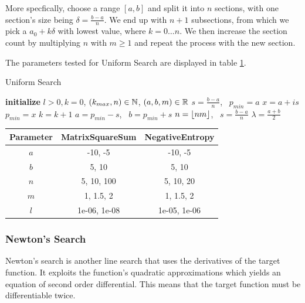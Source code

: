 \documentclass[a4paper,english,titlepage,12pt]{article}
\newcommand{\floor}[1]{\ensuremath\lfloor#1\rfloor}
\newcommand{\R}{\ensuremath\mathbb{R}}
\newcommand{\N}{\ensuremath\mathbb{N}}
\begin{document}
More specfically, choose a range $[a, b]$ and split it into $n$ sections, with one section's size being $\delta = \frac{b - a}{n}$. We end up with $n + 1$ subsections, from which we pick a $a_0 + k \delta$ with lowest value, where $k = 0 \dots n$. We then increase the section count by multiplying $n$ with $m \geq 1$ and repeat the process with the new section. \cite{course_material_nonlinear_optimisation}

The parameters tested for Uniform Search are displayed in table \ref{tab:params_UniformSearch}.


\begin{algorithm}[H]
\caption{Uniform Search}
\label{alg_uniform}
\begin{algorithmic}[1]
\STATE \textbf{initialize} $l > 0, k = 0$, $(k_{max}, n) \in \N$, $(a, b, m) \in \R$
\STATE $s = \frac{b - a}{n}$, \ $p_{min} = a$
        \STATE $x = a + i s$
            \STATE $p_{min} = x$
        \ENDIF
        \STATE $k = k + 1$
    \ENDFOR
    \STATE $a = p_{min} - s$, \ $b = p_{min} + s$
    \STATE $n = \floor{n m}$, \ $s = \frac{b - a}{n}$
\ENDWHILE
\RETURN $\lambda = \frac{a + b}{2}$
\end{algorithmic}
\end{algorithm}

\begin{table}[H]
\label{tab:params_UniformSearch}
\centering
{}
\begin{tabular}{|c|c|c|}
\hline
\rowcolor{gray!25}
Parameter & MatrixSquareSum & NegativeEntropy \\
\hline
$a$ & -10, -5 & -10, -5 \\
$b$ & 5, 10 & 5, 10 \\
$n$ & 5, 10, 100 & 5, 10, 20 \\
$m$ & 1, 1.5, 2 & 1, 1.5, 2 \\
$l$ & 1e-06, 1e-08 & 1e-05, 1e-06 \\
\hline
\end{tabular}
\end{table}


\subsubsection{Newton's Search}


Newton's search is another line search that uses the derivatives of the target function. It exploits the function's quadratic approximations which yields an equation of second order differential. This means that the target function must be differentiable twice. \cite{book:nonlinear_programming}
\end{document}
